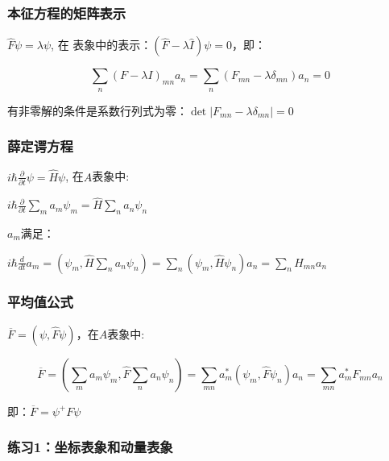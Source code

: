 \subsubsection{本征方程的矩阵表示}

$\widehat F\psi  = \lambda \psi $, 在 表象中的表示：$\left( {\widehat F - \lambda \widehat I} \right)\psi  = 0$，即：

\begin{equation}\label{19-6}
\sum\limits_n {\left( {F - \lambda I} \right)_{mn} a_n }  = \sum\limits_n {\left( {F_{mn}  - \lambda \delta _{mn} } \right)a_n }  = 0
\end{equation}

有非零解的条件是系数行列式为零：$\det \left| {F_{mn}  - \lambda \delta _{mn} } \right| = 0$

\subsubsection{薛定谔方程}

$i\hbar \frac{\partial }{{\partial t}}\psi  = \widehat H\psi $, 在$A$表象中:

$i\hbar \frac{\partial }{{\partial t}}\sum\limits_m {a_m \psi _m }  = \widehat H\sum\limits_n {a_n \psi _n } $

$a_m$满足：

$i\hbar \frac{d}{{dt}}a_m  = \left( {\psi _m ,\widehat H\sum\limits_n {a_n \psi _n } } \right) = \sum\limits_n {\left( {\psi _m ,\widehat H\psi _n } \right)a_n }  = \sum\limits_n {H_{mn} a_n } $

\subsubsection{平均值公式}


$\overline F  = \left( {\psi ,\widehat F\psi } \right)$，在$A$表象中:

\begin{equation}\label{19-7}
\overline F  = \left( {\sum\limits_m {a_m \psi _m } ,\widehat F\sum\limits_n {a_n \psi _n } } \right) = \sum\limits_{mn} {a_m^* \left( {\psi _m ,\widehat F\psi _n } \right)a_n }  = \sum\limits_{mn} {a_m^* F_{mn} a_n }
\end{equation}

即：$\overline F  = \psi ^ +  F\psi $

\subsubsection*{练习1：坐标表象和动量表象}

